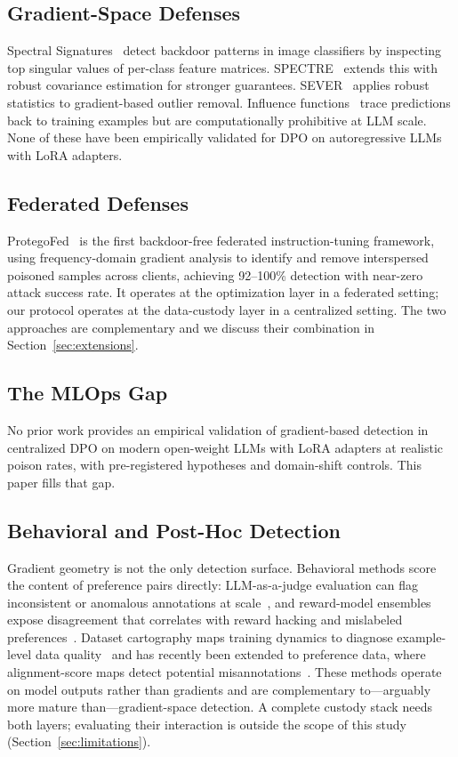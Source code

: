 \documentclass[runningheads]{llncs}
\begin{document}
\subsection{Gradient-Space Defenses}

Spectral Signatures~\cite{tran2018spectral} detect backdoor patterns in image
classifiers by inspecting top singular values of per-class feature matrices.
SPECTRE~\cite{hayase2021spectre} extends this with robust covariance estimation
for stronger guarantees. SEVER~\cite{diakonikolas2019sever} applies robust
statistics to gradient-based outlier removal.
Influence functions~\cite{koh2017influence} trace predictions back to training
examples but are computationally prohibitive at LLM scale.
None of these have been empirically validated for DPO on autoregressive LLMs
with LoRA adapters.

\subsection{Federated Defenses}

ProtegoFed~\cite{protegofed2026} is the first backdoor-free federated
instruction-tuning framework, using frequency-domain gradient analysis to
identify and remove interspersed poisoned samples across clients, achieving
92--100\% detection with near-zero attack success rate. It operates at the
optimization layer in a federated setting; our protocol operates at the
data-custody layer in a centralized setting. The two approaches are
complementary and we discuss their combination in Section~\ref{sec:extensions}.

\subsection{The MLOps Gap}

No prior work provides an empirical validation of gradient-based detection in
centralized DPO on modern open-weight LLMs with LoRA adapters at realistic
poison rates, with pre-registered hypotheses and domain-shift controls. This
paper fills that gap.

\subsection{Behavioral and Post-Hoc Detection}\label{sec:behavioral}

Gradient geometry is not the only detection surface. Behavioral methods score
the content of preference pairs directly: LLM-as-a-judge evaluation can flag
inconsistent or anomalous annotations at scale~\cite{zheng2023judge}, and
reward-model ensembles expose disagreement that correlates with reward hacking
and mislabeled preferences~\cite{eisenstein2023helping}. Dataset cartography
maps training dynamics to diagnose example-level data
quality~\cite{swayamdipta2020cartography} and has recently been extended to
preference data, where alignment-score maps detect potential
misannotations~\cite{lee2025cartography}. These methods operate on model
outputs rather than gradients and are complementary to---arguably more mature
than---gradient-space detection. A complete custody stack needs both layers;
evaluating their interaction is outside the scope of this study
(Section~\ref{sec:limitations}).
\end{document}
